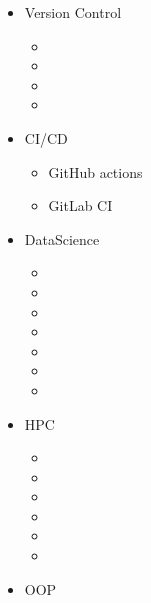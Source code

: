 \documentclass{CurriculumVitae}[10pt, condensed]
\begin{document}
\begin{multicols}{4}
  \begin{itemize}[topsep=0pt]
    \setlength{\itemsep}{-0.3em}
  \item {\footnotesize Version Control}
    \begin{itemize}[topsep=0pt, partopsep=0pt]
      \setlength{\itemsep}{-0.3em}
    \item {}
    \item {}
    \item {}
    \item {}
    \end{itemize}
  \item {\footnotesize CI/CD}
    \begin{itemize}[topsep=0pt, partopsep=0pt]
      \setlength{\itemsep}{-0.3em}
    \item {\footnotesize GitHub actions}
    \item {\footnotesize GitLab CI}
    \end{itemize}
  \item {\footnotesize DataScience}
    \begin{itemize}[topsep=0pt, partopsep=0pt]
      \setlength{\itemsep}{-0.3em}
    \item {}
    \item {}
    \item {}
    \item {}
    \item {}
    \item {}
    \item {}
    \end{itemize}
  \item {\footnotesize HPC}
    \begin{itemize}[topsep=0pt, partopsep=0pt]
      \setlength{\itemsep}{-0.3em}
    \item {}
    \item {}
    \item {}
    \item {}
    \item {}
    \item {}
    \end{itemize}
  \item {\footnotesize OOP}
    \begin{itemize}[topsep=0pt, partopsep=0pt]
      \setlength{\itemsep}{-0.3em}

\end{itemize}
\end{itemize}
\end{multicols}
\end{document}
